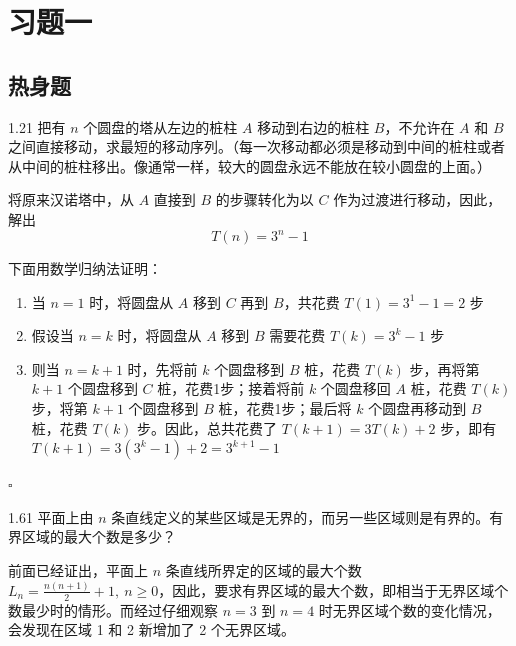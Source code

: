 \section{习题一}

\subsection{热身题}

\begin{problem}{1.2}{1}
  把有 \( n \) 个圆盘的塔从左边的桩柱 \( A \) 移动到右边的桩柱 \( B \)，不允许在 \( A \) 和 \( B \) 之间直接移动，求最短的移动序列。（每一次移动都必须是移动到中间的桩柱或者从中间的桩柱移出。像通常一样，较大的圆盘永远不能放在较小圆盘的上面。）
\end{problem}

将原来汉诺塔中，从 \( A \) 直接到 \( B \) 的步骤转化为以 \( C \) 作为过渡进行移动，因此，解出
\[
  T(n) = 3^n - 1
\]

下面用数学归纳法证明：
\begin{enumerate}
  \item 当 \( n=1 \) 时，将圆盘从 \( A \) 移到 \( C \) 再到 \( B \)，共花费 \( T(1) = 3^1 - 1 = 2 \) 步
  \item 假设当 \( n=k \) 时，将圆盘从 \( A \) 移到 \( B \) 需要花费 \( T(k) = 3^k - 1 \) 步
  \item 则当 \( n=k+1 \) 时，先将前 \( k \) 个圆盘移到 \( B \) 桩，花费 \( T(k) \) 步，再将第 \( k+1 \) 个圆盘移到 \( C \) 桩，花费1步；接着将前 \( k \) 个圆盘移回 \( A \) 桩，花费 \( T(k) \) 步，将第 \( k+1 \) 个圆盘移到 \( B \) 桩，花费1步；最后将 \( k \) 个圆盘再移动到 \( B \) 桩，花费 \( T(k) \) 步。因此，总共花费了 \( T(k+1) = 3T(k) + 2 \) 步，即有 \( T(k+1) = 3(3^k - 1) + 2 = 3^{k+1} - 1 \)
\end{enumerate}
\hfill \( \square \)

\begin{problem}{1.6}{1}
  平面上由 \( n \) 条直线定义的某些区域是无界的，而另一些区域则是有界的。有界区域的最大个数是多少？
\end{problem}

前面已经证出，平面上 \( n \) 条直线所界定的区域的最大个数 \( L_n = \frac{n(n+1)}{2} + 1, \ n \ge 0 \)，因此，要求有界区域的最大个数，即相当于无界区域个数最少时的情形。而经过仔细观察 \( n=3 \) 到 \( n=4 \) 时无界区域个数的变化情况，会发现在区域 1 和 2 新增加了 2 个无界区域。

